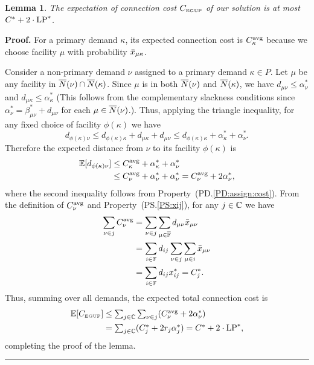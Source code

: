 \documentclass[oneside,final]{ucr}
\newtheorem{lemma}[theorem]{Lemma}
\newenvironment{proof}[1][Proof]{\textbf{#1.} }{\ \rule{0.5em}{0.5em}}
\begin{document}
\begin{lemma}\label{lemma:3dist}
The expectation of connection cost $C_{\mbox{\tiny\rm EGUP}}$ of our solution
is at most  $C^\ast+2\cdot\mbox{\rm LP}^\ast$.
\end{lemma}
\begin{proof}
  For a primary demand $\kappa$, its expected connection cost is
  $C_{\kappa}^{{\mbox{\scriptsize\rm avg}}}$ because we choose facility $\mu$ with
  probability ${\bar x}_{\mu\kappa}$.

  Consider a non-primary demand $\nu$ assigned to a primary demand
  $\kappa\in P$. Let $\mu$ be any facility in ${\overline{N}}(\nu) \cap
  {\overline{N}}(\kappa)$.  Since $\mu$ is in both ${\overline{N}}(\nu)$ and
  ${\overline{N}}(\kappa)$, we have $d_{\mu\nu} \leq \alpha_{\nu}^\ast$ and
  $d_{\mu\kappa} \leq \alpha_{\kappa}^\ast$ (This follows from the
  complementary slackness conditions since
  $\alpha_{\nu}^\ast=\beta_{\mu\nu}^\ast + d_{\mu\nu}$ for each
  $\mu\in {\overline{N}}(\nu)$.). Thus, applying the triangle inequality, for
  any fixed choice of facility $\phi(\kappa)$ we have
%
\begin{equation*}
    d_{\phi(\kappa)\nu} \leq d_{\phi(\kappa)\kappa}+d_{\mu\kappa}+d_{\mu\nu}
    \leq d_{\phi(\kappa)\kappa} + \alpha_{\kappa}^\ast + \alpha_{\nu}^\ast.
\end{equation*}
%
Therefore the expected distance from $\nu$ to its facility $\phi(\kappa)$ is 
%
\begin{align*}
  \mathbb{E}[  d_{\phi(\kappa)\nu}   ] &\le C^{{\mbox{\scriptsize\rm avg}}}_{\kappa} + \alpha_{\kappa}^\ast + \alpha_{\nu}^\ast 
\\
  &\leq C^{{\mbox{\scriptsize\rm avg}}}_{\nu} + \alpha_{\nu}^\ast + \alpha_{\nu}^\ast
   = C^{{\mbox{\scriptsize\rm avg}}}_{\nu} + 2\alpha_{\nu}^\ast,
  \end{align*}
%
  where the second inequality follows from Property~(PD.\ref{PD:assign:cost}).  
From the definition of $C^{{\mbox{\scriptsize\rm avg}}}_{\nu}$ and Property~(PS.\ref{PS:xij}), for any $j\in \mathbb{C}$ 
we have
%
\begin{align*}
\sum_{\nu\in j} C^{{\mbox{\scriptsize\rm avg}}}_{\nu} &= \sum_{\nu\in j}\sum_{\mu\in\overline{\mathbb{F}}}d_{\mu\nu}{\bar x}_{\mu\nu}
			\\
 			&= \sum_{i\in\mathbb{F}} d_{ij}\sum_{\nu\in j}\sum_{\mu\in i}{\bar x}_{\mu\nu}
			\\
			&= \sum_{i\in\mathbb{F}} d_{ij}x^\ast_{ij} 
			= C^\ast_j.
\end{align*}
% 
Thus, summing over all demands, the expected total connection cost is
%
\begin{align*}
    \mathbb{E}[C_{\mbox{\tiny\rm EGUP}}] &\le 
			\textstyle{\sum_{j\in\mathbb{C}} \sum_{\nu\in j}} (C^{{\mbox{\scriptsize\rm avg}}}_{\nu} + 2\alpha_{\nu}^\ast) 
			\\
    	& = \textstyle{\sum_{j\in\mathbb{C}}} (C_j^\ast + 2r_j\alpha_j^\ast)
 		= C^\ast + 2\cdot\mbox{\rm LP}^\ast,
\end{align*}
%
completing the proof of the lemma.
\end{proof}
\end{document}
